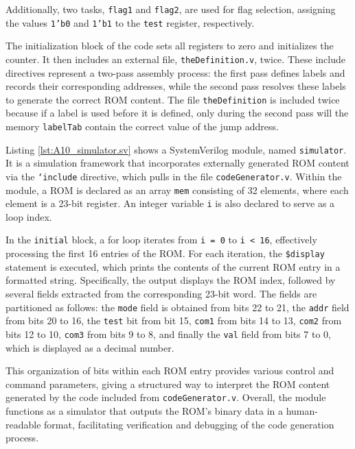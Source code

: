 Additionally, two tasks, \texttt{flag1} and \texttt{flag2}, are used for flag selection, assigning the values \texttt{1'b0} and \texttt{1'b1} to the \texttt{test} register, respectively.

The initialization block of the code sets all registers to zero and initializes the counter. It then includes an external file, \texttt{theDefinition.v}, twice. These include directives represent a two-pass assembly process: the first pass defines labels and records their corresponding addresses, while the second pass resolves these labels to generate the correct ROM content. The file {\tt theDefinition} is included twice because if a
label is used before it is defined, only during the second pass will the
memory {\tt labelTab} contain the correct value of the jump address.


Listing \ref{lst:A10_simulator.sv} shows a SystemVerilog module, named \texttt{simulator}. It is a simulation framework that incorporates externally generated ROM content via the \texttt{`include} directive, which pulls in the file \texttt{codeGenerator.v}. Within the module, a ROM is declared as an array \texttt{mem} consisting of 32 elements, where each element is a 23-bit register. An integer variable \texttt{i} is also declared to serve as a loop index.

In the \texttt{initial} block, a for loop iterates from \texttt{i = 0} to \texttt{i < 16}, effectively processing the first 16 entries of the ROM. For each iteration, the \texttt{\$display} statement is executed, which prints the contents of the current ROM entry in a formatted string. Specifically, the output displays the ROM index, followed by several fields extracted from the corresponding 23-bit word. The fields are partitioned as follows: the \texttt{mode} field is obtained from bits 22 to 21, the \texttt{addr} field from bits 20 to 16, the \texttt{test} bit from bit 15, \texttt{com1} from bits 14 to 13, \texttt{com2} from bits 12 to 10, \texttt{com3} from bits 9 to 8, and finally the \texttt{val} field from bits 7 to 0, which is displayed as a decimal number.

This organization of bits within each ROM entry provides various control and command parameters, giving a structured way to interpret the ROM content generated by the code included from \texttt{codeGenerator.v}. Overall, the module functions as a simulator that outputs the ROM's binary data in a human-readable format, facilitating verification and debugging of the code generation process.

